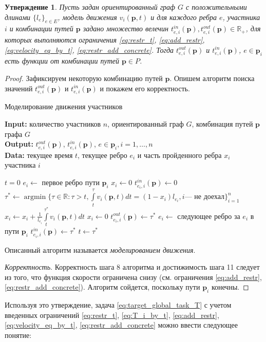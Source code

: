 \documentclass[12pt, a4paper]{article}
\DeclareMathOperator*{\argmin}{argmin}
\newtheorem{state}{Утверждение}[section]
\begin{document}
\begin{state}
\label{state:modeling}
Пусть задан ориентированный граф $G$ с положительными длинами $\{l_e\}_{e \in E}$, модель движения $v_i(\textbf{p}, t)$ и для каждого ребра $e$, участника $i$ и комбинации путей $\textbf{p}$ задано множество велечин $t_{e, i}^{in}(\textbf{p}), t_{e, i}^{out}(\textbf{p}) \in \mathbb{R}_+$, для которых выполняются ограничения \eqref{eq:restr_t}, \eqref{eq:add_restr}, \eqref{eq:velocity_eq_by_t}, \eqref{eq:restr_add_concrete}. Тогда $t_{e, i}^{out}(\textbf{p})$ и $t_{e, i}^{in}(\textbf{p})$, $e \in \textbf{p}_i$ есть функции от комбинации путей $\textbf{p} \in P$.
\end{state}
\begin{proof}
Зафиксируем некоторую комбинацию путей $\textbf{p}$. Опишем алгоритм поиска значений $t_{e, i}^{out}(\textbf{p})$ и $t_{e, i}^{in}(\textbf{p})$ и покажем его корректность.

\begin{algorithm}
	\caption{Моделирование движения участников}
	\label{alg:modeling}
	{\bf {Input:}} количество участников $n$, ориентированный граф $G$, комбинация путей $\textbf{p}$ графа $G$\\
	{\bf {Output:}} $t_{e, i}^{out}(\textbf{p})$, $t_{e, i}^{in}(\textbf{p})$, $e \in \textbf{p}_i, i = 1, \ldots, n$\\
	{\bf {Data:}} текущее время $t$, текущее ребро $e_i$ и часть пройденного ребра $x_i$ участника $i$
	\begin{algorithmic}[1]
		\State $t = 0$
		\State $e_i \gets$ { первое ребро пути $\textbf{p}_i$}
		\State $x_i \gets 0$
		\State $t_{e_i, i}^{in}(\textbf{p}) \gets 0$ 
		\EndFor
		\State $\tau^* \gets \argmin\{ \tau \in \mathbb{R}: \tau > t, \int\limits_{t}^{\tau} v_i(\textbf{p}, t) dt = (1 - x_i) l_{e_i}, i \text{--- не доехал}  \}_{i = 1}^n$
		\State $x_i \gets x_i + \frac{1}{l_{e_i}} \int\limits_{t}^{\tau^*} v_i(\textbf{p}, t) dt$
				\State $x_i \gets 0$
				\State $t_{e_i, i}^{out}(\textbf{p}) \gets \tau^*$ 
				\State $e_i \gets$ следующее ребро за $e_i$ в пути $\textbf{p}_i$
				\State $t_{e_i, i}^{in}(\textbf{p}) \gets \tau^*$ 
			\EndIf
		\EndFor
		\State $t \gets \tau^*$
		\EndWhile
	\end{algorithmic}
\end{algorithm}

Описанный алгоритм называется \textit{моделированием движения}.

\textit{Корректность}. Корректность шага 8 алгоритма и достижимость шага 11 следует из того, что функция скорости ограничена снизу (см. ограничения \eqref{eq:add_restr}, \eqref{eq:restr_add_concrete}). Алгоритм сойдется, поскольку пути $\textbf{p}_i$ конечны.

\end{proof}
 Используя это утверждение, задача \eqref{eq:target_global_task_T} с учетом введенных ограничений \eqref{eq:restr_t}, \eqref{eq:T_i_by_t}, \eqref{eq:add_restr}, \eqref{eq:velocity_eq_by_t}, \eqref{eq:restr_add_concrete} можно ввести следующее понятие:
\end{document}
